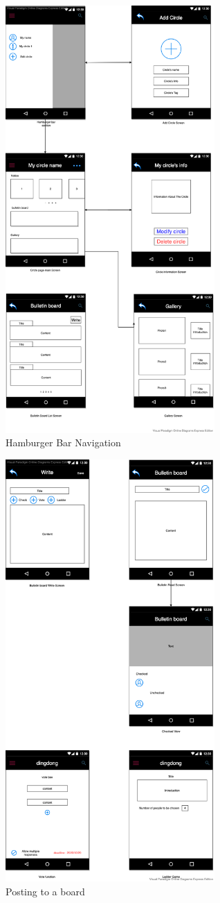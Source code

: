 \documentclass[conference]{IEEEtran}
\begin{document}
\begin{figure}[t]
    \centering
    \includegraphics[width=8cm]{images/image8.png}
    \caption{Hamburger Bar Navigation}
    \label{fig: Views}
\end{figure}
\begin{figure}[b]
    \centering
    \includegraphics[width=8cm]{images/image9.png}
    \caption{Posting to a board}
    \label{fig: Views}
\end{figure}
\clearpage
\end{document}
